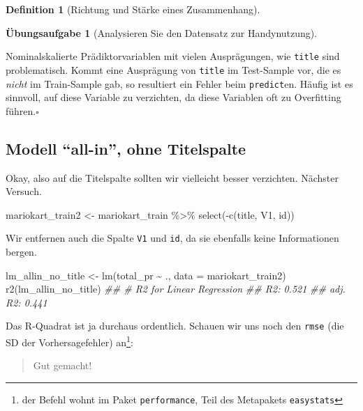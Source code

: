 \documentclass[
  a4paper,
  DIV=11]{scrreprt}
\newenvironment{Shaded}{\begin{snugshade}}{\end{snugshade}}
\newcommand{\AttributeTok}[1]{\textcolor[rgb]{0.40,0.45,0.13}{#1}}
\newcommand{\DocumentationTok}[1]{\textcolor[rgb]{0.37,0.37,0.37}{\textit{#1}}}
\newcommand{\FunctionTok}[1]{\textcolor[rgb]{0.28,0.35,0.67}{#1}}
\newcommand{\NormalTok}[1]{\textcolor[rgb]{0.00,0.23,0.31}{#1}}
\newcommand{\OtherTok}[1]{\textcolor[rgb]{0.00,0.23,0.31}{#1}}
\newcommand{\SpecialCharTok}[1]{\textcolor[rgb]{0.37,0.37,0.37}{#1}}
\theoremstyle{definition}
\newtheorem{exercise}{Übungsaufgabe}[chapter]
\theoremstyle{definition}
\theoremstyle{definition}
\newtheorem{definition}{Definition}[chapter]
\theoremstyle{remark}
\begin{document}
\begin{definition}[Richtung und Stärke eines
Zusammenhang]
\begin{exercise}[Analysieren Sie den Datensatz zur
Handynutzung]
\begin{tcolorbox}
Nominalskalierte Prädiktorvariablen mit vielen Ausprägungen, wie
\texttt{title} sind problematisch. Kommt eine Ausprägung von
\texttt{title} im Test-Sample vor, die es \emph{nicht} im Train-Sample
gab, so resultiert ein Fehler beim \texttt{predict}en. Häufig ist es
sinnvoll, auf diese Variable zu verzichten, da diese Variablen oft zu
Overfitting führen.\(\square\)

\end{tcolorbox}

\subsection{Modell ``all-in'', ohne
Titelspalte}\label{modell-all-in-ohne-titelspalte}

Okay, also auf die Titelspalte sollten wir vielleicht besser verzichten.
Nächster Versuch.

\begin{Shaded}
\begin{Highlighting}[]
\NormalTok{mariokart\_train2 }\OtherTok{\textless{}{-}}
\NormalTok{  mariokart\_train }\SpecialCharTok{\%\textgreater{}\%} 
  \FunctionTok{select}\NormalTok{(}\SpecialCharTok{{-}}\FunctionTok{c}\NormalTok{(title, V1, id))}
\end{Highlighting}
\end{Shaded}

Wir entfernen auch die Spalte \texttt{V1} und \texttt{id}, da sie
ebenfalls keine Informationen bergen.

\begin{Shaded}
\begin{Highlighting}[]
\NormalTok{lm\_allin\_no\_title }\OtherTok{\textless{}{-}} \FunctionTok{lm}\NormalTok{(total\_pr }\SpecialCharTok{\textasciitilde{}}\NormalTok{ ., }\AttributeTok{data =}\NormalTok{ mariokart\_train2)}
\FunctionTok{r2}\NormalTok{(lm\_allin\_no\_title) }
\DocumentationTok{\#\# \# R2 for Linear Regression}
\DocumentationTok{\#\#        R2: 0.521}
\DocumentationTok{\#\#   adj. R2: 0.441}
\end{Highlighting}
\end{Shaded}

Das R-Quadrat ist ja durchaus ordentlich. Schauen wir uns noch den
\texttt{rmse} (die SD der Vorhersagefehler) an\footnote{der Befehl wohnt
  im Paket \texttt{performance}, Teil des Metapakets \texttt{easystats}}:

\begin{quote}
{} Gut gemacht!
\end{quote}


\end{exercise}
\end{definition}
\end{document}
